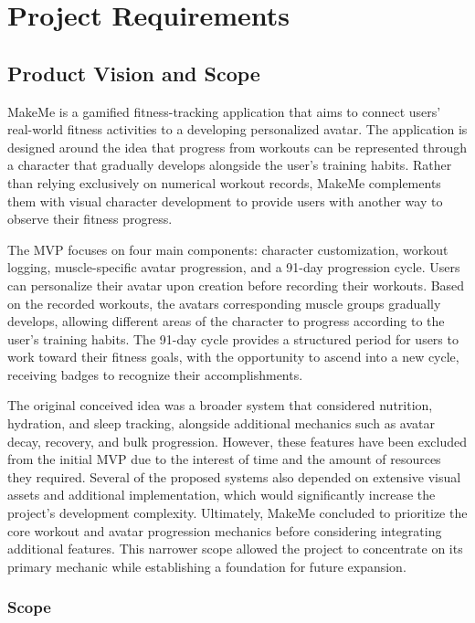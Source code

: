 \documentclass[11pt]{article}
\begin{document}
\section{Project Requirements}
\subsection{Product Vision and Scope}
\label{sec:vision}
MakeMe is a gamified fitness-tracking application that aims to connect users’ real-world fitness
activities to a developing personalized avatar. The application is designed around the idea that
progress from workouts can be represented through a character that gradually develops alongside
the user’s training habits. Rather than relying exclusively on numerical workout records, MakeMe
complements them with visual character development to provide users with another way to observe
their fitness progress.

The MVP focuses on four main components: character customization, workout logging, muscle-specific
avatar progression, and a 91-day progression cycle. Users can personalize their avatar upon
creation before recording their workouts. Based on the recorded workouts, the avatars
corresponding muscle groups gradually develops, allowing different areas of the character
to progress according to the user’s training habits. The 91-day cycle provides a structured
period for users to work toward their fitness goals, with the opportunity to ascend into a
new cycle, receiving badges to recognize their accomplishments.

The original conceived idea was a broader system that considered nutrition, hydration, and sleep
tracking, alongside additional mechanics such as avatar decay, recovery, and bulk progression.
However, these features have been excluded from the initial MVP due to the interest of time and
the amount of resources they required. Several of the proposed systems also depended on extensive
visual assets and additional implementation, which would significantly increase the project’s
development complexity. Ultimately, MakeMe concluded to prioritize the core workout and avatar
progression mechanics before considering integrating additional features. This narrower scope
allowed the project to concentrate on its primary mechanic while establishing a foundation for
future expansion.

\subsubsection{Scope}
\end{document}

